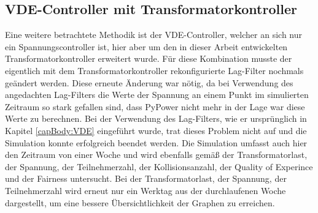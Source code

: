 \subsection{VDE-Controller mit Transformatorkontroller}
\label{chap_VDE_t}
Eine weitere betrachtete Methodik ist der VDE-Controller, welcher an sich nur ein Spannungscontroller ist, hier aber um den in dieser Arbeit entwickelten Transformatorkontroller erweitert wurde. Für diese Kombination musste der eigentlich mit dem Transformatorkontroller rekonfigurierte Lag-Filter nochmals geändert werden. Diese erneute Änderung war nötig, da bei Verwendung des angedachten Lag-Filters  die Werte der Spannung an einem Punkt im simulierten Zeitraum so stark gefallen sind, dass PyPower nicht mehr in der Lage war diese Werte zu berechnen. Bei der Verwendung des Lag-Filters, wie er ursprünglich in Kapitel \ref{capBody:VDE} eingeführt wurde, trat dieses Problem nicht auf und die Simulation konnte erfolgreich beendet werden. Die Simulation umfasst auch hier den Zeitraum von einer Woche und wird ebenfalls gemäß der Transformatorlast, der Spannung, der Teilnehmerzahl, der Kollisionsanzahl, der Quality of Experince und der Fairness untersucht. Bei der Transformatorlast, der Spannung, der Teilnehmerzahl wird erneut nur ein Werktag aus der durchlaufenen Woche dargestellt, um eine bessere Übersichtlichkeit der Graphen zu erreichen. \\
